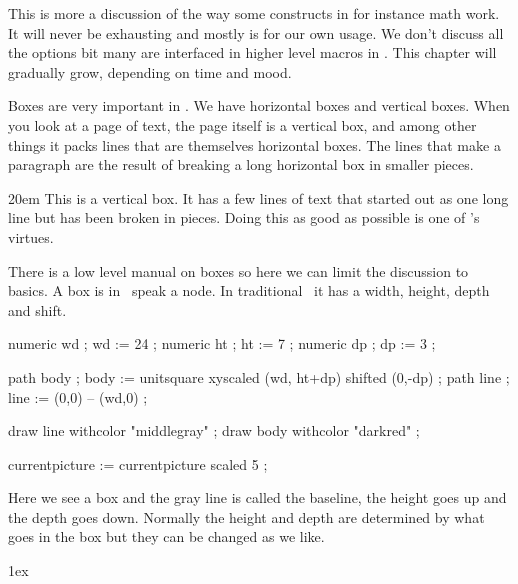 \startsection[title={Introduction}]

This is more a discussion of the way some constructs in for instance math work.
It will never be exhausting and mostly is for our own usage. We don't discuss all
the options bit many are interfaced in higher level macros in \CONTEXT. This
chapter will gradually grow, depending on time and mood.

\stopsection

\startsection[title=Boxes]

Boxes are very important in \TEX. We have horizontal boxes and vertical boxes.
When you look at a page of text, the page itself is a vertical box, and among
other things it packs lines that are themselves horizontal boxes. The lines that
make a paragraph are the result of breaking a long horizontal box in smaller
pieces.

\startlinecorrection
{} \bgroup \hsize 20em \showmakeup[line] \showboxes
    This is a vertical box. It has a few lines of text that started out as
    one long line but has been broken in pieces. Doing this as good as possible
    is one of \TEX's virtues.
\egroup
\stoplinecorrection

There is a low level manual on boxes so here we can limit the discussion to
basics. A box is in \TEX\ speak a node. In traditional \TEX\ it has a
width, height, depth and shift.

\startlinecorrection
\startMPcode
    numeric wd ; wd := 24 ;
    numeric ht ; ht :=  7 ;
    numeric dp ; dp :=  3 ;

    path body ; body := unitsquare xyscaled (wd, ht+dp) shifted (0,-dp) ;
    path line ; line := (0,0) -- (wd,0) ;

    draw line withcolor "middlegray" ;
    draw body withcolor "darkred" ;

    currentpicture := currentpicture scaled 5 ;
\stopMPcode
\stoplinecorrection

Here we see a box and the gray line is called the baseline, the height goes up
and the depth goes down. Normally the height and depth are determined by what
goes in the box but they can be changed as we like.

\startbuffer
\setbox\scratchboxone{}
\setbox\scratchboxtwo{}

\boxshift\scratchboxtwo 1ex \dontleavehmode \box\scratchboxone\box\scratchboxtwo

\setbox\scratchboxone{}
\setbox\scratchboxtwo{}

